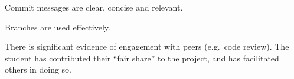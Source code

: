 \documentclass{../fal_assignment}
\begin{document}
\begin{markingrubric}
            \par Commit messages are clear, concise and relevant.
            \par Branches are used effectively.
            \par There is significant evidence of engagement with peers (e.g.\ code review).
%
        \grade The student has contributed their ``fair share'' to the project,
            and has facilitated others in doing so.
\end{markingrubric}

\end{document}
